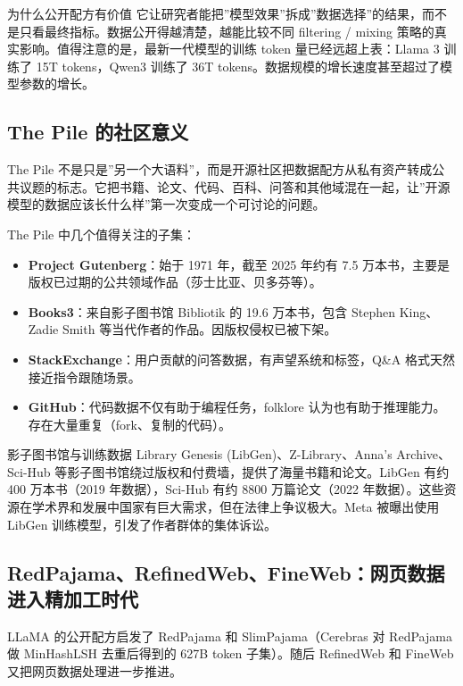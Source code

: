 \documentclass[a4paper]{article}
\begin{document}
\begin{knowledgebox}{为什么公开配方有价值}
它让研究者能把”模型效果”拆成”数据选择”的结果，而不是只看最终指标。数据公开得越清楚，越能比较不同 filtering / mixing 策略的真实影响。值得注意的是，最新一代模型的训练 token 量已经远超上表：Llama 3 训练了 15T tokens，Qwen3 训练了 36T tokens。数据规模的增长速度甚至超过了模型参数的增长。
\end{knowledgebox}

\subsection{The Pile 的社区意义}

The Pile 不是只是”另一个大语料”，而是开源社区把数据配方从私有资产转成公共议题的标志。它把书籍、论文、代码、百科、问答和其他域混在一起，让”开源模型的数据应该长什么样”第一次变成一个可讨论的问题。

The Pile 中几个值得关注的子集：
\begin{itemize}
    \item \textbf{Project Gutenberg}：始于 1971 年，截至 2025 年约有 7.5 万本书，主要是版权已过期的公共领域作品（莎士比亚、贝多芬等）。
    \item \textbf{Books3}：来自影子图书馆 Bibliotik 的 19.6 万本书，包含 Stephen King、Zadie Smith 等当代作者的作品。因版权侵权已被下架。
    \item \textbf{StackExchange}：用户贡献的问答数据，有声望系统和标签，Q\&A 格式天然接近指令跟随场景。
    \item \textbf{GitHub}：代码数据不仅有助于编程任务，folklore 认为也有助于推理能力。存在大量重复（fork、复制的代码）。
\end{itemize}

\begin{knowledgebox}{影子图书馆与训练数据}
Library Genesis (LibGen)、Z-Library、Anna's Archive、Sci-Hub 等影子图书馆绕过版权和付费墙，提供了海量书籍和论文。LibGen 有约 400 万本书（2019 年数据），Sci-Hub 有约 8800 万篇论文（2022 年数据）。这些资源在学术界和发展中国家有巨大需求，但在法律上争议极大。Meta 被曝出使用 LibGen 训练模型，引发了作者群体的集体诉讼。
\end{knowledgebox}

\subsection{RedPajama、RefinedWeb、FineWeb：网页数据进入精加工时代}

LLaMA 的公开配方启发了 RedPajama 和 SlimPajama（Cerebras 对 RedPajama 做 MinHashLSH 去重后得到的 627B token 子集）。随后 RefinedWeb 和 FineWeb 又把网页数据处理进一步推进。
\end{document}
